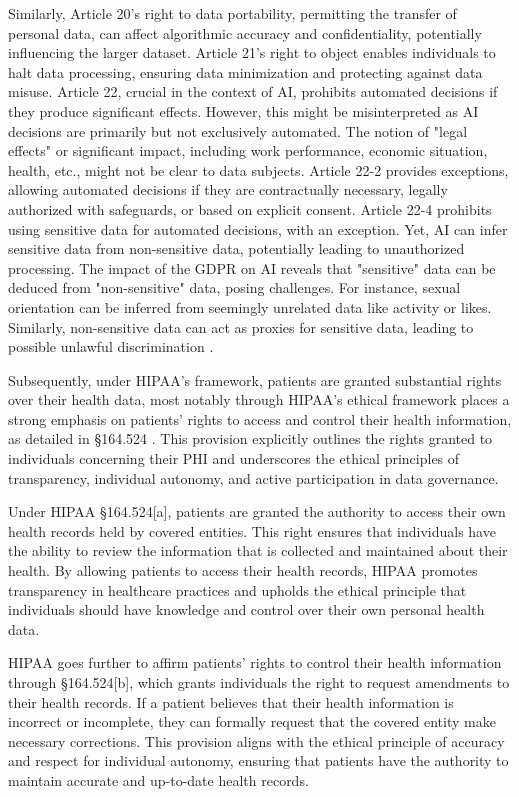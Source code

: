 \documentclass{article}
\begin{document}
Similarly, Article 20's right to data portability, permitting the transfer of personal data, can affect algorithmic accuracy and confidentiality, potentially influencing the larger dataset.
Article 21's right to object enables individuals to halt data processing, ensuring data minimization and protecting against data misuse. Article 22, crucial in the context of AI, prohibits automated decisions if they produce significant effects. However, this might be misinterpreted as AI decisions are primarily but not exclusively automated. The notion of "legal effects" or significant impact, including work performance, economic situation, health, etc., might not be clear to data subjects.
Article 22-2 provides exceptions, allowing automated decisions if they are contractually necessary, legally authorized with safeguards, or based on explicit consent. Article 22-4 prohibits using sensitive data for automated decisions, with an exception. Yet, AI can infer sensitive data from non-sensitive data, potentially leading to unauthorized processing.
The impact of the GDPR on AI reveals that "sensitive" data can be deduced from "non-sensitive" data, posing challenges. For instance, sexual orientation can be inferred from seemingly unrelated data like activity or likes. Similarly, non-sensitive data can act as proxies for sensitive data, leading to possible unlawful discrimination \cite{wachter2018normative}.

Subsequently, under HIPAA's framework, patients are granted substantial rights over their health data, most notably through 
HIPAA's ethical framework places a strong emphasis on patients' rights to access and control their health information, as detailed in §164.524 
 \cite{keogh2019unforeseen, aalami2021applications}. This provision explicitly outlines the rights granted to individuals concerning their PHI and underscores the ethical principles of transparency, individual autonomy, and active participation in data governance.

Under HIPAA §164.524[a], patients are granted the authority to access their own health records held by covered entities. This right ensures that individuals have the ability to review the information that is collected and maintained about their health. By allowing patients to access their health records, HIPAA promotes transparency in healthcare practices and upholds the ethical principle that individuals should have knowledge and control over their own personal health data.

HIPAA goes further to affirm patients' rights to control their health information through §164.524[b], which grants individuals the right to request amendments to their health records. If a patient believes that their health information is incorrect or incomplete, they can formally request that the covered entity make necessary corrections. This provision aligns with the ethical principle of accuracy and respect for individual autonomy, ensuring that patients have the authority to maintain accurate and up-to-date health records.
\end{document}

